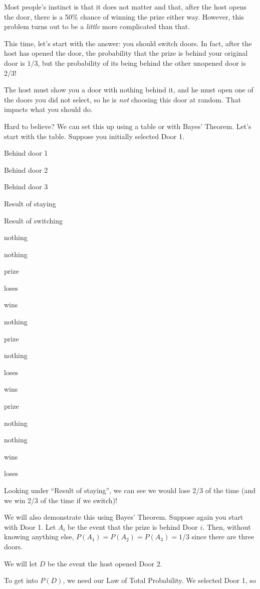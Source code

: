 \documentclass[
]{book}
\begin{document}
Most people's instinct is that it does not matter and that, after the host opens the door, there is a 50\% chance of winning the prize either way. However, this problem turns out to be a \emph{little} more complicated than that.

This time, let's start with the answer: you should switch doors. In fact, after the host has opened the door, the probability that the prize is behind your original door is \(1/3\), but the probability of its being behind the other unopened door is \(2/3\)!

The host must show you a door with nothing behind it, and he must open one of the doors you did not select, so he is \emph{not} choosing this door at random. That impacts what you should do.

Hard to believe? We can set this up using a table or with Bayes' Theorem. Let's start with the table. Suppose you initially selected Door 1.

Behind door 1

Behind door 2

Behind door 3

Result of staying

Result of switching

nothing

nothing

prize

loses

wins

nothing

prize

nothing

loses

wins

prize

nothing

nothing

wins

loses

Looking under ``Result of staying'', we can see we would lose 2/3 of the time (and we win 2/3 of the time if we switch)!

We will also demonstrate this using Bayes' Theorem. Suppose again you start with Door 1. Let \(A_i\) be the event that the prize is behind Door \(i\). Then, without knowing anything else, \(P(A_1) = P(A_2) = P(A_3) = 1/3\) since there are three doors.

We will let \(D\) be the event the host opened Door \(2\).

To get into \(P(D)\), we need our Law of Total Probability. We selected Door 1, so
\end{document}
